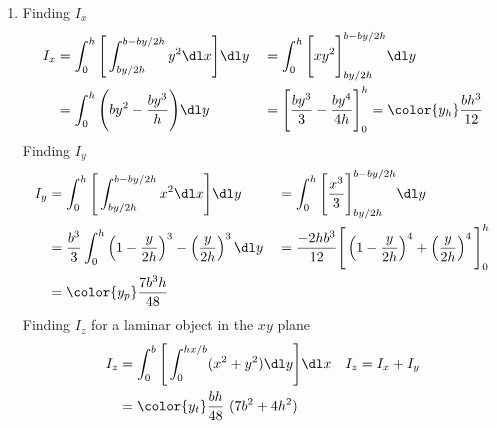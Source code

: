 \begin{enumerate}
    \item Finding $ I_x $
          \begin{align}
              I_x   & = \int_{0}^{h} \Bigg[\int_{by/2h}^{b - by/2h} y^2 \dl x \Bigg]
              \dl y &
                    & = \int_{0}^{h} \Bigg[xy^2\Bigg]_{by/2h}^{b - by/2h} \dl y        \\
                    & = \int_{0}^{h} \Bigg(by^2 - \frac{by^3}{h}\Bigg) \dl y         &
                    & = \Bigg[ \frac{by^3}{3} - \frac{by^4}{4h} \Bigg]_0^h
              = \color{y_h} \frac{bh^3}{12}
          \end{align}
          Finding $ I_y $
          \begin{align}
              I_y   & = \int_{0}^{h} \Bigg[\int_{by/2h}^{b - by/2h} x^2 \dl x \Bigg]
              \dl y &
                    & = \int_{0}^{h} \Bigg[ \frac{x^3}{3} \Bigg]_{by/2h}^{b - by/2h}
              \dl y                                                                   \\
                    & = \frac{b^3}{3} \int_{0}^{h} \left( 1 - \frac{y}{2h}\right)^3 -
              \left( \frac{y}{2h} \right)^3
              \dl y &
                    & = \frac{-2hb^3}{12} \Bigg[\left( 1 - \frac{y}{2h} \right)^4
              + \left( \frac{y}{2h} \right)^4 \Bigg]_0^h                              \\
                    & = \color{y_p} \frac{7b^3h}{48}
          \end{align}
          Finding $ I_z $ for a laminar object in the $ xy $ plane
          \begin{align}
              I_z   & = \int_{0}^{b} \Bigg[\int_{0}^{hx/b} (x^2 + y^2) \dl y\Bigg]
              \dl x &
              I_z   & = I_x + I_y                                                  \\
                    & = \color{y_t} \frac{bh}{48}\ (7b^2 + 4h^2)
          \end{align}


\end{enumerate}
